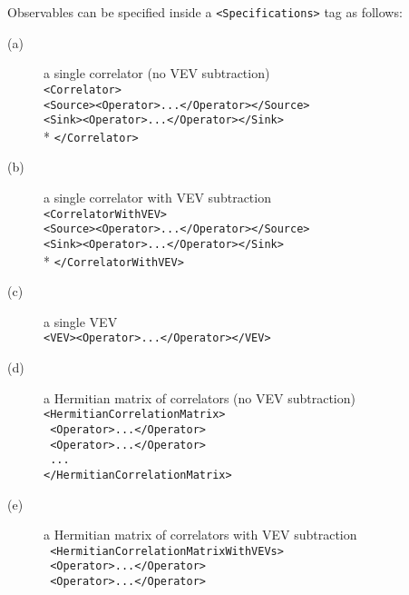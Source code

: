 \documentclass[12pt,notitlepage,letterpaper]{article}
\newcommand{\vb}{\texttt}
\begin{document}
Observables can be specified inside a \vb{<Specifications>} tag as follows:
\begin{description}
\item[(a)]
a single correlator (no VEV subtraction)\\
\texttt{<Correlator>}\\
\hspace*{15pt}\texttt{<Source><Operator>...</Operator></Source>}\\
\hspace*{15pt}\texttt{<Sink><Operator>...</Operator></Sink>}\\                                              *
\texttt{</Correlator>}
\item[(b)]
 a single correlator with VEV subtraction\\
\texttt{<CorrelatorWithVEV>}\\
\hspace*{15pt}\texttt{<Source><Operator>...</Operator></Source>}\\
\hspace*{15pt}\texttt{<Sink><Operator>...</Operator></Sink>}\\                                              *
\texttt{</CorrelatorWithVEV>}
\item[(c)]
 a single VEV\\
\texttt{<VEV><Operator>...</Operator></VEV>}
\item[(d)]
  a Hermitian matrix of correlators (no VEV subtraction)\\
\texttt{<HermitianCorrelationMatrix>}\\
\hspace*{15pt}\texttt{    <Operator>...</Operator>}\\
\hspace*{15pt}\texttt{    <Operator>...</Operator>}\\
\hspace*{25pt}\texttt{   ...              }  \\
\texttt{</HermitianCorrelationMatrix>}
\item[(e)]
 a Hermitian matrix of correlators with VEV subtraction\\
\texttt{       <HermitianCorrelationMatrixWithVEVs>  }\\   
\hspace*{15pt}\texttt{           <Operator>...</Operator>    }\\         
\hspace*{15pt}\texttt{           <Operator>...</Operator> }\\

\end{description}
\end{document}
